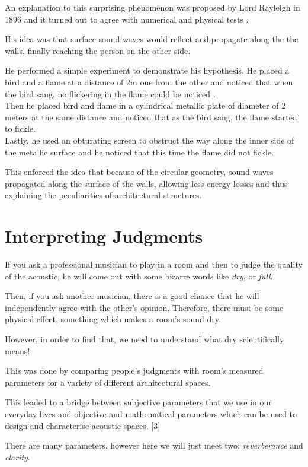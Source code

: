 \documentclass[a4paper]{article}
\begin{document}
An explanation to this surprising phenomenon was proposed by Lord Rayleigh in 1896 and it turned out to agree with numerical and physical tests \cite{article:whispering}. 

His idea was that surface sound waves would reflect and propagate along the the walls, finally reaching the person on the other side.

He performed a simple experiment to demonstrate his hypothesis. He placed a bird and a flame at a distance of 2m one from the other and noticed that when the bird sang, no flickering in the flame could be noticed \cite{article:whispering}.\\
Then he placed bird and flame in a cylindrical metallic plate of diameter of 2 meters at the same distance and noticed that as the bird sang, the flame started to fickle.\\
Lastly, he used an obturating screen to obstruct the way along the inner side of the metallic surface and he noticed that this time the flame did not fickle. \cite{article:whispering}

This enforced the idea that because of the circular geometry, sound waves propagated along the surface of the walls, allowing less energy losses and thus explaining the peculiarities of architectural structures.

\section{Interpreting Judgments}
If you ask a professional musician to play in a room and then to judge the quality of the acoustic, he will come out with some bizarre words like \textit{dry}, or \textit{full}.

Then, if you ask another musician, there is a good chance that he will independently agree with the other’s opinion. Therefore, there must be some physical effect, something which makes a room’s sound dry.

However, in order to find that, we need to understand what dry scientifically means! 

This was done by comparing people’s judgments with room’s measured parameters for a variety of different architectural spaces.

This leaded to a bridge between subjective parameters that we use in our everyday lives and objective and mathematical parameters which can be used to design and characterise acoustic spaces. [3]

There are many parameters, however here we will just meet two: \textit{reverberance} and \textit{clarity}.
\end{document}
